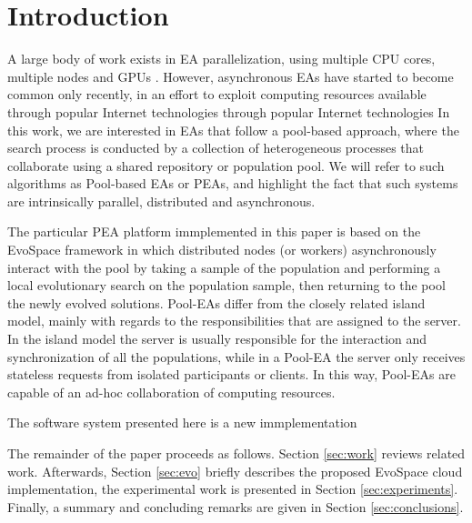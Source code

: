 \section{Introduction}
A large body of work exists in EA parallelization, using multiple CPU cores, multiple 
nodes and GPUs \cite{cantu2000efficient,hofmann2013performance}.
However, asynchronous EAs have started to become common only recently, 
in an effort to exploit computing resources available through popular Internet technologies
through popular Internet technologies
In this work, we are interested in EAs that follow a
pool-based approach, where the search process is conducted by a
collection of heterogeneous processes that collaborate using
a shared repository or population pool. We will refer to such
algorithms as Pool-based EAs or PEAs, and highlight the fact that such
systems are intrinsically parallel, distributed and asynchronous.

The particular PEA platform immplemented in this paper is based on  
the EvoSpace framework \cite{GValdez2015} in which distributed nodes 
(or workers) asynchronously interact  with the pool by taking a sample 
of the population and performing a local evolutionary search on 
the population sample, then returning to the pool the newly evolved solutions. 
Pool-EAs differ from the closely related island model, mainly with regards to 
the responsibilities that are assigned to the server. In the island model 
the server is usually responsible for the interaction and synchronization 
of all the populations, while in a Pool-EA the server only receives stateless
requests from isolated participants or clients. In this way, Pool-EAs 
are capable of an ad-hoc collaboration of computing resources. 

The software system presented here is a new immplementation 

The remainder of the paper proceeds as follows.  Section \ref{sec:work} 
reviews related work. Afterwards, Section \ref{sec:evo} briefly describes the
proposed EvoSpace cloud implementation, the experimental work is presented in 
Section \ref{sec:experiments}. Finally, a summary and concluding remarks are given in
Section \ref{sec:conclusions}.



